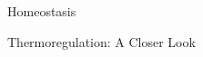 \documentclass[12pt,letterpaper]{article}
\begin{document}
\hypertarget{40.4}{}
\begin{secbox}{Homeostasis}{

}\end{secbox}
\hypertarget{40.5}{}
\begin{secbox}{Thermoregulation: A Closer Look}{

}\end{secbox}
\end{document}
